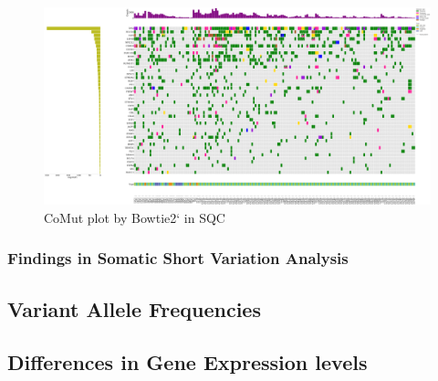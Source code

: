 \documentclass[a4paper]{article}
\begin{document}
                \begin{figure}[htbp]
                    \centering
                    \includegraphics[width=\linewidth]{figures/Mutect2/Bowtie2-SQC.pdf}
                    \caption{CoMut plot by Bowtie2` in SQC}
                    \label{fig:comut-Bowtie2-SQC}
                \end{figure}

            \subsubsection{Findings in Somatic Short Variation Analysis}

        \subsection{Variant Allele Frequencies}

        \subsection{Differences in Gene Expression levels}
\end{document}
